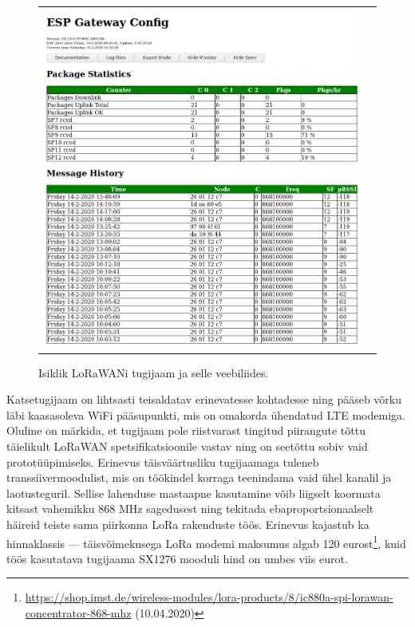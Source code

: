 \documentclass[12pt]{article}
\begin{document}
\begin{figure} [htbp]
\begin{tabular}{c c}
\begin{minipage}{0.53\textwidth}
                \includegraphics[width=\textwidth]{figures/ttn-jaama-liides.png}
            \end{minipage}
        \end{tabular}
        \caption{Isiklik LoRaWANi tugijaam ja selle veebiliides.}
        \label{fig:omatugijaam}
    \end{figure}

    Katsetugijaam on lihtsasti teisaldatav erinevatesse kohtadesse ning pääseb võrku läbi kaasasoleva WiFi pääsupunkti, mis on omakorda ühendatud LTE modemiga.
    Oluline on märkida, et tugijaam pole riistvarast tingitud piirangute tõttu täielikult LoRaWAN spetsifikatsioonile vastav ning on seetõttu sobiv vaid prototüüpimiseks.
    Erinevus täisväärtusliku tugijaamaga tuleneb transsiivermoodulist, mis on töökindel korraga teenindama vaid ühel kanalil ja laotusteguril.
    Sellise lahenduse mastaapne kasutamine võib liigselt koormata kitsast vahemikku 868 MHz sagedusest ning tekitada ebaproportsionaalselt häireid teiste sama piirkonna LoRa rakenduste töös.
    Erinevus kajastub ka hinnaklassis — täisvõimekusega LoRa modemi maksumus algab 120 eurost\footnote{\url{https://shop.imst.de/wireless-modules/lora-products/8/ic880a-spi-lorawan-concentrator-868-mhz} (10.04.2020)}, kuid töös kasutatava tugijaama SX1276 mooduli hind on umbes viis eurot.
\end{document}
